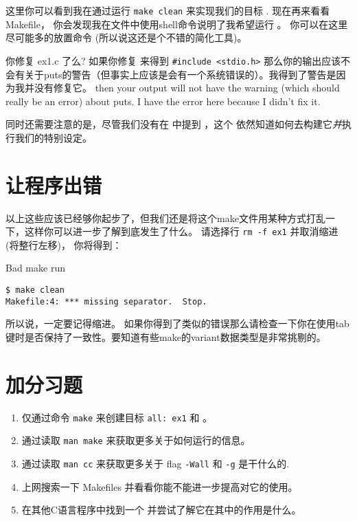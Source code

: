 这里你可以看到我在通过运行 \verb|make clean| 来实现我们的目标 .  现在再来看看 Makefile， 你会发现我在文件中使用shell命令说明了我希望运行 。 你可以在这里尽可能多的放置命令 (所以说这还是个不错的简化工具)。 

\begin{aside}{你修复 ex1.c 了么?}
如果你修复  来得到 \verb|#include <stdio.h>| 那么你的输出应该不会有关于puts的警告（但事实上应该是会有一个系统错误的）。我得到了警告是因为我并没有修复它。 then your output will not have the warning (which should really be an error) about puts.  I have the error here because I didn't fix it.
\end{aside}

同时还需要注意的是，尽管我们没有在  中提到  ，这个  依然知道如何去构建它\emph{并}执行我们的特别设定。


\section{让程序出错}

以上这些应该已经够你起步了，但我们还是将这个make文件用某种方式打乱一下，这样你可以进一步了解到底发生了什么。 请选择行 \verb|rm -f ex1| 并取消缩进 (将整行左移)， 你将得到：

\begin{Terminal}{Bad make run}
\begin{lstlisting}
$ make clean
Makefile:4: *** missing separator.  Stop.
\end{lstlisting}
\end{Terminal}

所以说，一定要记得缩进。
如果你得到了类似的错误那么请检查一下你在使用tab键时是否保持了一致性。要知道有些make的variant数据类型是非常挑剔的。


\section{加分习题}

\begin{enumerate}
\item 仅通过命令 \verb|make| 来创建目标 \verb|all: ex1| 和 。
\item 通过读取 \verb|man make| 来获取更多关于如何运行的信息。
\item 通过读取 \verb|man cc| 来获取更多关于 flag \verb|-Wall| 和 \verb|-g| 是干什么的.
\item 上网搜索一下 Makefiles 并看看你能不能进一步提高对它的使用。
\item 在其他C语言程序中找到一个  并尝试了解它在其中的作用是什么。
\end{enumerate}

